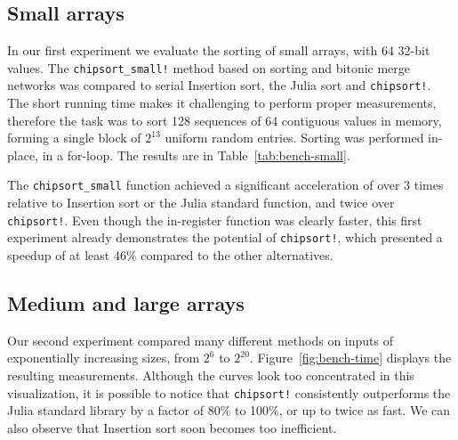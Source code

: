 \documentclass{juliacon}
\begin{document}
\subsection{Small arrays}
In our first experiment we evaluate the sorting of small arrays, with 64 32-bit values. The {\tt chipsort\_small!} method based on sorting and bitonic merge networks was compared to serial Insertion sort, the Julia sort and {\tt chipsort!}. The short running time makes it challenging to perform proper measurements, therefore the task was to sort 128 sequences of 64 contiguous values in memory, forming a single block of $2^{13}$ uniform random entries. Sorting was performed in-place, in a for-loop. The results are in Table~\ref{tab:bench-small}.

\begin{table}[h]
\label{tab:bench-small}
\end{table}

The {\tt chipsort\_small} function achieved a significant acceleration of over 3 times relative to Insertion sort or the Julia standard function, and twice over {\tt chipsort!}. Even though the in-register function was clearly faster, this first experiment already demonstrates the potential of {\tt chipsort!}, which presented a speedup of at least 46\% compared to the other alternatives.

\subsection{Medium and large arrays}
Our second experiment compared many different methods on inputs of exponentially increasing sizes, from $2^6$ to $2^{20}$. Figure~\ref{fig:bench-time} displays the resulting measurements. Although the curves look too concentrated in this visualization, it is possible to notice that {\tt chipsort!} consistently outperforms the Julia standard library by a factor of 80\% to 100\%, or up to twice as fast. We can also observe that Insertion sort soon becomes too inefficient.
\end{document}
